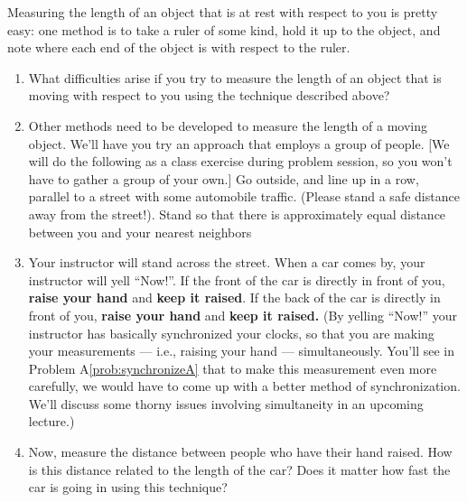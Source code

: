 \begin{exercise}
  Measuring the length of an object that is at rest with respect to
  you is pretty easy: one method is to take a ruler of some kind, hold
  it up to the object, and note where each end of the object is with
  respect to the ruler.
  \begin{enumerate}
  \item What difficulties arise if you try to measure the length of an
    object that is moving with respect to you using the technique
    described above? 

  \item Other methods need to be developed to measure the length of a
    moving object.  We'll have you try an approach that employs a
    group of people.  [We will do the following as a class exercise
    during problem session, so you won't have to gather a group of
    your own.]  Go outside, and line up in a row, parallel to a street
    with some automobile traffic.  (Please stand a safe distance away
    from the street!).  Stand so that there is approximately equal
    distance between you and your nearest neighbors 

  \item Your instructor will stand across the street.  When a car
    comes by, your instructor will yell ``Now!''.  If the front of the
    car is directly in front of you, \textbf{raise your hand} and \textbf{      keep it raised}.  If the back of the car is directly in front of
    you, \textbf{raise your hand} and \textbf{keep it raised.}  (By yelling
    ``Now!'' your instructor has basically synchronized your clocks,
    so that you are making your measurements --- i.e., raising your
    hand --- simultaneously.  You'll see in Problem
    A\ref{prob:synchronizeA} that to make this measurement even more
    carefully, we would have to come up with a better method of
    synchronization.  We'll discuss some thorny issues involving
    simultaneity in an upcoming lecture.)  

  \item Now, measure the distance between people who have their hand
    raised.  How is this distance related to the length of the car?
    Does it matter how fast the car is going in using this technique?
  \end{enumerate}
  \label{prob:moving_objI}
\end{exercise}

